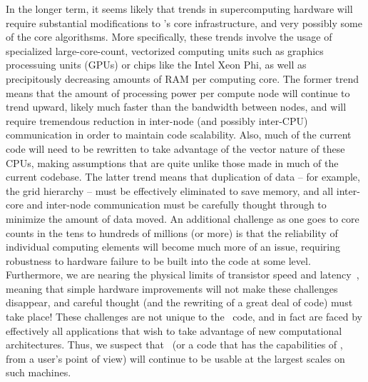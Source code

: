 In the longer term, it seems likely that trends in supercomputing
hardware will require substantial modifications to \enzo's core
infrastructure, and very possibly some of the core algorithsms.  More
specifically, these trends involve the usage of specialized
large-core-count, vectorized computing units such as graphics
processuing units (GPUs) or chips like the Intel Xeon Phi, as well as
precipitously decreasing amounts of RAM per computing core.  The
former trend means that the amount of processing power per compute
node will continue to trend upward, likely much faster than the
bandwidth between nodes, and will require tremendous reduction in
inter-node (and possibly inter-CPU) communication in order to maintain
code scalability.  Also, much of the current code will need to be
rewritten to take advantage of the vector nature of these CPUs, making
assumptions that are quite unlike those made in much of the current
codebase.  The latter trend means that duplication of data -- for
example, the grid hierarchy -- must be effectively eliminated to save
memory, and all inter-core and inter-node communication must be
carefully thought through to minimize the amount of data moved.  An
additional challenge as one goes to core counts in the tens to
hundreds of millions (or more) is that the reliability of individual
computing elements will become much more of an issue, requiring
robustness to hardware failure to be built into the code at some
level.  Furthermore, we are nearing the physical limits of transistor
speed and latency~\citep{feynman1999feynman}, meaning that simple
hardware improvements will not make these challenges disappear, and
careful thought (and the rewriting of a great deal of code) must take
place!  These challenges are not unique to the \enzo\ code, and in
fact are faced by effectively all applications that wish to take
advantage of new computational architectures.  Thus, we suspect that
\enzo\ (or a code that has the capabilities of \enzo, from a user's
point of view) will continue to be usable at the largest scales on
such machines.
